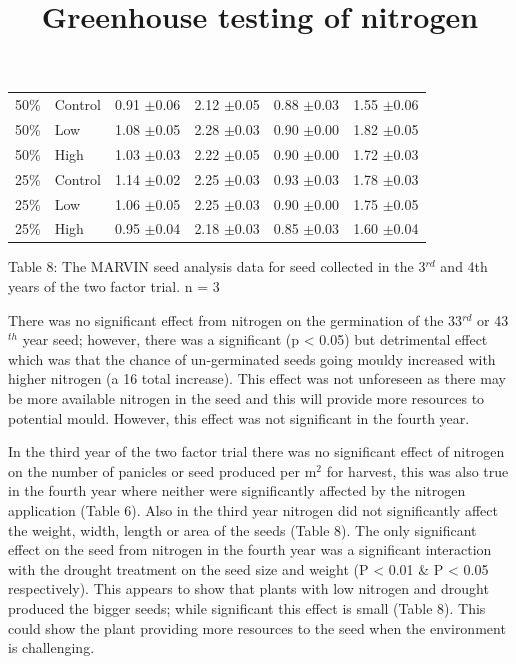 \documentclass[fleqn, 15pt, lineno]{olplainarticle}
\begin{document}
\begin{table}[ht]
\begin{tabular}{l l  S S  S  S}
50\%		& Control 	&0.91 $\pm$0.06 &2.12 $\pm$0.05     &0.88 $\pm$0.03	&1.55 $\pm$0.06 \\
50\%		& Low 		&1.08 $\pm$0.05	&2.28 $\pm$0.03     &0.90 $\pm$0.00	&1.82 $\pm$0.05 \\
50\%		& High 		&1.03 $\pm$0.03 &2.22 $\pm$0.05     &0.90 $\pm$0.00	&1.72 $\pm$0.03 \\
25\%		& Control 	&1.14 $\pm$0.02 &2.25 $\pm$0.03     &0.93 $\pm$0.03	&1.78 $\pm$0.03 \\
25\%		& Low 		&1.06 $\pm$0.05 &2.25 $\pm$0.03     &0.90 $\pm$0.00	&1.75 $\pm$0.05 \\
25\%		& High 		&0.95 $\pm$0.04 &2.18 $\pm$0.03     &0.85 $\pm$0.03	&1.60 $\pm$0.04 \\
\bottomrule
\end{tabular}
\label{tab:twofactorseed}
\end{table}


Table 8: The MARVIN seed analysis data for seed collected in the 3$^{rd}$ and 4th years of the two factor trial.
n = 3
 

There was no significant effect from nitrogen on the germination of the 33$^{rd}$ or 43$^{th}$ year seed; however, there was a significant (p < 0.05) but detrimental effect which was that the chance of un-germinated seeds going mouldy increased with higher nitrogen (a 16 total increase).
This effect was not unforeseen as there may be more available nitrogen in the seed and this will provide more resources to potential mould.
However, this effect was not significant in the fourth year.

In the third year of the two factor trial there was no significant effect of nitrogen on the number of panicles or seed produced per m$^2$ for harvest, this was also true in the fourth year where neither were significantly affected by the nitrogen application (Table 6).
Also in the third year nitrogen did not significantly affect the weight, width, length or area of the seeds (Table 8).
The only significant effect on the seed from nitrogen in the fourth year was a significant interaction with the drought treatment on the seed size and weight (P < 0.01 \& P < 0.05 respectively).
This appears to show that plants with low nitrogen and drought produced the bigger seeds; while significant this effect is small (Table 8).
This could show the plant providing more resources to the seed when the environment is challenging.




\FloatBarrier
\title{Greenhouse testing of nitrogen}
\end{document}
